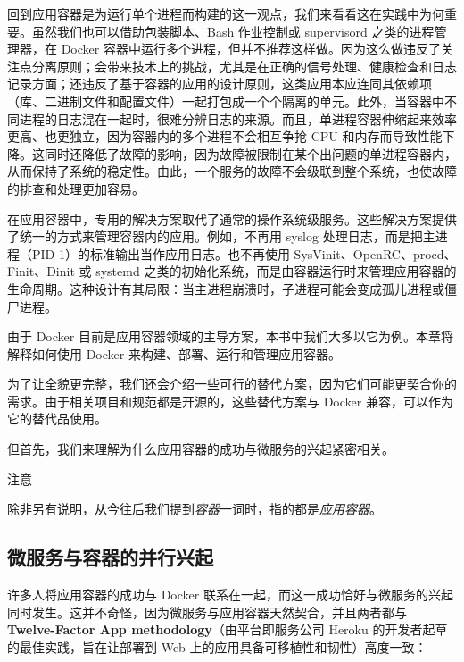 回到应用容器是为运行单个进程而构建的这一观点，我们来看看这在实践中为何重要。虽然我们也可以借助包装脚本、Bash 作业控制或 supervisord 之类的进程管理器，在 Docker 容器中运行多个进程，但并不推荐这样做。因为这么做违反了关注点分离原则；会带来技术上的挑战，尤其是在正确的信号处理、健康检查和日志记录方面；还违反了基于容器的应用的设计原则，这类应用本应连同其依赖项（库、二进制文件和配置文件）一起打包成一个个隔离的单元。此外，当容器中不同进程的日志混在一起时，很难分辨日志的来源。而且，单进程容器伸缩起来效率更高、也更独立，因为容器内的多个进程不会相互争抢 CPU 和内存而导致性能下降。这同时还降低了故障的影响，因为故障被限制在某个出问题的单进程容器内，从而保持了系统的稳定性。由此，一个服务的故障不会级联到整个系统，也使故障的排查和处理更加容易。

在应用容器中，专用的解决方案取代了通常的操作系统级服务。这些解决方案提供了统一的方式来管理容器内的应用。例如，不再用 syslog 处理日志，而是把主进程（PID 1）的标准输出当作应用日志。也不再使用 SysVinit、OpenRC、procd、Finit、Dinit 或 systemd 之类的初始化系统，而是由容器运行时来管理应用容器的生命周期。这种设计有其局限：当主进程崩溃时，子进程可能会变成孤儿进程或僵尸进程。

由于 Docker 目前是应用容器领域的主导方案，本书中我们大多以它为例。本章将解释如何使用 Docker 来构建、部署、运行和管理应用容器。

\label{idx:1717}
为了让全貌更完整，我们还会介绍一些可行的替代方案，因为它们可能更契合你的需求。由于相关项目和规范都是开源的，这些替代方案与 Docker 兼容，可以作为它的替代品使用。

但首先，我们来理解为什么应用容器的成功与微服务的兴起紧密相关。

\begin{myNotic}{注意}

除非另有说明，从今往后我们提到\emph{容器}一词时，指的都是\emph{应用容器}。
\end{myNotic}

\subsection{微服务与容器的并行兴起}

\label{idx:1718}
\label{idx:1719}
许多人将应用容器的成功与 Docker 联系在一起，而这一成功恰好与微服务的兴起同时发生。这并不奇怪，因为微服务与应用容器天然契合，并且两者都与 \textbf{Twelve-Factor App methodology}（由平台即服务公司 Heroku 的开发者起草的最佳实践，旨在让部署到 Web 上的应用具备可移植性和韧性）高度一致：

